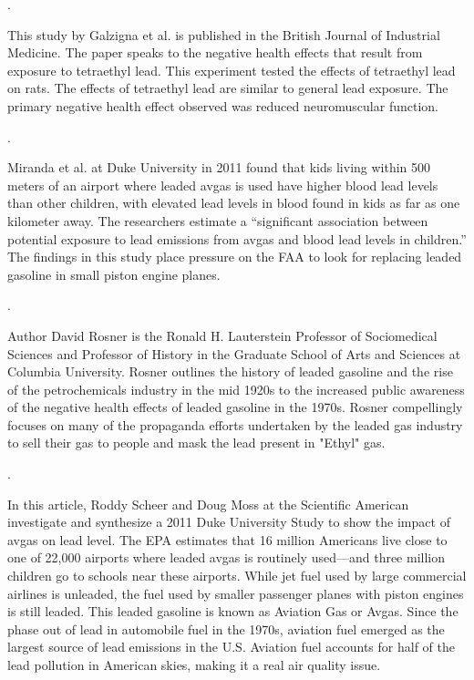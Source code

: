\documentclass{article}
\begin{document}
\bigskip
\noindent {} .

This study by Galzigna et al. is published in the British Journal of Industrial Medicine. The paper speaks to the negative health effects that result from exposure to tetraethyl lead. This experiment tested the effects of tetraethyl lead on rats. The effects of tetraethyl lead are similar to general lead exposure. The primary negative health effect observed was reduced neuromuscular function.  

\bigskip


\noindent {} .

Miranda et al. at Duke University in 2011 found that kids living within 500 meters of an airport where leaded avgas is used have higher blood lead levels than other children, with elevated lead levels in blood found in kids as far as one kilometer away. The researchers estimate a “significant association between potential exposure to lead emissions from avgas and blood lead levels in children.” The findings in this study place pressure on the FAA to look for replacing leaded gasoline in small piston engine planes. 

\bigskip

\noindent {} .

Author David Rosner is the Ronald H. Lauterstein Professor of Sociomedical Sciences and Professor of History in the Graduate School of Arts and Sciences at Columbia University. Rosner outlines the history of leaded gasoline and the rise of the petrochemicals industry in the mid 1920s to the increased public awareness of the negative health effects of leaded gasoline in the 1970s. Rosner compellingly focuses on many of the propaganda efforts undertaken by the leaded gas industry to sell their gas to people and mask the lead present in "Ethyl" gas. 

\bigskip

\noindent {} .

In this article, Roddy Scheer and Doug Moss at the Scientific American investigate and synthesize a 2011 Duke University Study to show the impact of avgas on lead level. The EPA estimates that 16 million Americans live close to one of 22,000 airports where leaded avgas is routinely used—and three million children go to schools near these airports. While jet fuel used by large commercial airlines is unleaded, the fuel used by smaller passenger planes with piston engines is still leaded. This leaded gasoline is known as Aviation Gas or Avgas. Since the phase out of lead in automobile fuel in the 1970s, aviation fuel emerged as the largest source of lead emissions in the U.S. Aviation fuel accounts for half of the lead pollution in American skies, making it a real air quality issue. 
\end{document}
